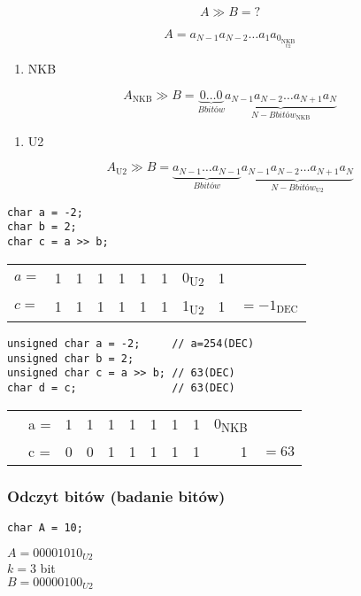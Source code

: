 \documentclass[11pt]{article}
\begin{document}
$$A \gg B = ?$$

$$A= a_{N-1} a_{N-2} \dots a_1 a_0 _{ \underset{ \text{U2}}{\text{NKB}} } $$
\begin{enumerate}
\item NKB
\end{enumerate}
$$A_{\text{NKB}} \gg B = \underbrace{0 \dots 0}_{B \textit{bitów}} \underbrace{a_{N-1} a_{N-2} \dots a_{N+1} a_{N}}_{ {N-B} \textit{bitów}} _\text{NKB} $$

\begin{enumerate}
\item U2
\end{enumerate}
$$A_{\text{U2}} \gg B = \underbrace{a_{N-1} \dots a_{N-1}}_{B \textit{bitów}} \underbrace{a_{N-1} a_{N-2} \dots a_{N+1} a_{N}}_{ {N-B} \textit{bitów}} _\text{U2} $$

\hline

\begin{verbatim}
char a = -2;
char b = 2;
char c = a >> b;
\end{verbatim}
\begin{center}
\begin{tabular}{lrrrrrrlrl}
\(a =\) & 1 & 1 & 1 & 1 & 1 & 1 & 0\textsubscript{U2} & 1 & \\
\(c =\) & 1 & 1 & 1 & 1 & 1 & 1 & 1\textsubscript{U2} & 1 & \(= -1_{\text{DEC}}\)\\
\end{tabular}
\end{center}

\hline
\begin{verbatim}
unsigned char a = -2;     // a=254(DEC)
unsigned char b = 2;
unsigned char c = a >> b; // 63(DEC)
char d = c;               // 63(DEC)
\end{verbatim}

\begin{center}
\begin{tabular}{llrrrrrrrrl}
 & a = & 1 & 1 & 1 & 1 & 1 & 1 & 1 & 0\textsubscript{NKB} & \\
 & c = & 0 & 0 & 1 & 1 & 1 & 1 & 1 & 1 & \(= 63\)\\
\end{tabular}
\end{center}

\subsubsection{Odczyt bitów (badanie bitów)}
\label{sec:org5bc6811}
\begin{verbatim}
char A = 10;
\end{verbatim}
\(A=00001010_{U2}\) \\
\(k=3\) bit \\
\(B=00000100_{U2}\)
\end{document}
